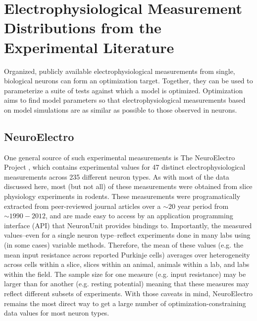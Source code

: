\section{Electrophysiological Measurement Distributions from the Experimental Literature}
\label{sec:data-sources}
Organized, publicly available electrophysiological measurements from single, biological neurons can form an optimization target.
Together, they can be used to parameterize a suite of tests against which a model is optimized.
Optimization aims to find model parameters so that electrophysiological measurements based on model simulations are as similar as possible to those observed in neurons.

\subsection{NeuroElectro}
\label{sec:neuroelectro}
One general source of such experimental measurements is The NeuroElectro Project \citep{tripathy2014neuroelectro}, which contains experimental values for 47 distinct electrophysiological measurements across 235 different neuron types.
As with most of the data discussed here, most (but not all) of these measurements were obtained from slice physiology experiments in rodents.
These measurements were programatically extracted from peer-reviewed journal articles over a $\sim20$ year period from $\sim1990-2012$,
and are made easy to access by an application programming interface (API) that NeuronUnit provides bindings to.
Importantly, the measured values--even for a single neuron type--reflect experiments done in many labs using (in some cases) variable methods.
Therefore, the mean of these values (e.g. the mean input resistance across reported Purkinje cells) averages over heterogeneity across cells within a slice, slices within an animal, animals within a lab, and labs within the field.
The sample size for one measure (e.g. input resistance) may be larger than for another (e.g. resting potential) meaning that these measures may reflect different subsets of experiments.
With those caveats in mind, NeuroElectro remains the most direct way to get a large number of optimization-constraining data values for most neuron types.

